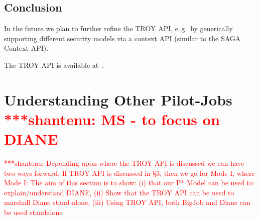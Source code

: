 \documentclass[conference,final]{IEEEtran}
\newcommand{\jhanote}[1]{ {\textcolor{red} { ***shantenu: #1 }}}
\newcommand{\jhanote}[1]{}
\begin{document}
% 
% 

\subsection{Conclusion}

In the future we plan to further refine the TROY API, e.\,g.\ by generically supporting different security models via a context API (similar to the SAGA Context API).

The TROY API is available at~\cite{troy_api}.


\section{Understanding Other Pilot-Jobs \jhanote{MS - to focus on
    DIANE}}


\jhanote{Depending upon where the TROY API is discussed we can have
  two ways forward. If TROY API is discussed in \S 3, then we go for
  Mode I, where Mode I: The aim of this section is to show: (i) that
  our P* Model can be used to explain/understand DIANE, (ii) Show that
  the TROY API can be used to marshall Diane stand-alone, (iii) Using
  TROY API, both BigJob and Diane can be used standalone}
\end{document}
